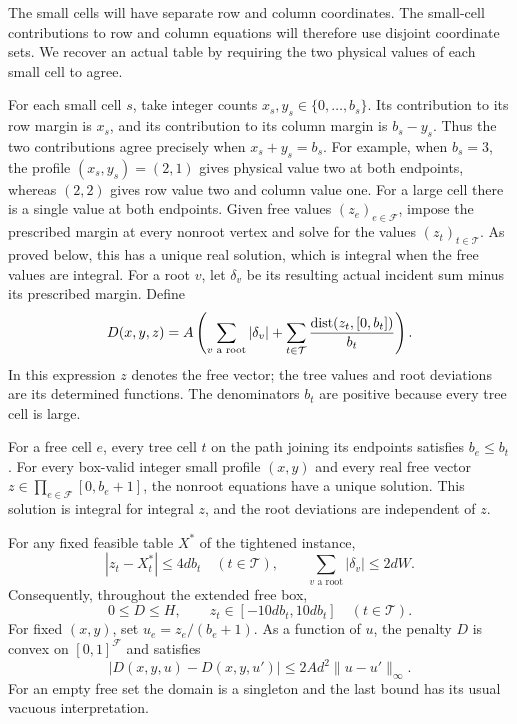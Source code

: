 The small cells will have separate row and column coordinates.  The small-cell
contributions to row and column equations will therefore use disjoint
coordinate sets.  We recover an actual table by requiring the two
physical values of each small cell to agree.

For each small cell $s$, take integer counts
$x_s,y_s\in\{0,\ldots,b_s\}$.  Its contribution to its row margin is
$x_s$, and its contribution to its column margin is $b_s-y_s$.
Thus the two contributions agree precisely when $x_s+y_s=b_s$.
For example, when $b_s=3$, the profile $(x_s,y_s)=(2,1)$ gives
physical value two at both endpoints, whereas $(2,2)$ gives row value
two and column value one.
For a large cell there is a single value at both endpoints.  Given
free values $(z_e)_{e\in\mathcal F}$, impose the prescribed margin at
every nonroot vertex and solve for the values $(z_t)_{t\in\mathcal T}$.
As proved below, this has a unique real solution, which is integral
when the free values are integral.  For a root $v$, let $\delta_v$
be its resulting actual incident sum minus its prescribed margin.
Define
\begin{equation}\label{eq:penalty}
D(x,y,z)=A\left(
\sum_{v\text{ a root}}|\delta_v|
+\sum_{t\in\mathcal T}
\frac{\operatorname{dist}(z_t,[0,b_t])}{b_t}
\right).
\end{equation}
In this expression $z$ denotes the free vector; the tree values and
root deviations are its determined functions.  The denominators
$b_t$ are positive because every tree cell is large.

\begin{lemma}\label{lem:forest}
For a free cell $e$, every tree cell $t$ on the path joining its
endpoints satisfies $b_e\le b_t$.  For every box-valid integer small profile
$(x,y)$ and every real free vector
$z\in\prod_{e\in\mathcal F}[0,b_e+1]$, the nonroot equations have a
unique solution.  This solution is integral for integral $z$, and
the root deviations are independent of $z$.

For any fixed feasible table $X^*$ of the tightened instance,
\begin{equation}\label{eq:forest-displacement}
|z_t-X^*_t|\le4db_t\quad(t\in\mathcal T),
\qquad
\sum_{v\text{ a root}}|\delta_v|\le2dW.
\end{equation}
Consequently, throughout the extended free box,
\[
0\le D\le H,\qquad
z_t\in[-10db_t,10db_t]\quad(t\in\mathcal T).
\]
For fixed $(x,y)$, set $u_e=z_e/(b_e+1)$.  As a function of $u$,
the penalty $D$ is convex on $[0,1]^{\mathcal F}$ and satisfies
\begin{equation}\label{eq:forest-lipschitz}
|D(x,y,u)-D(x,y,u')|
\le2Ad^2\|u-u'\|_\infty.
\end{equation}
For an empty free set the domain is a singleton and the last bound
has its usual vacuous interpretation.
\end{lemma}

